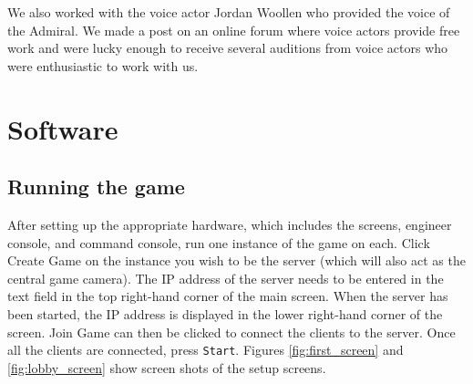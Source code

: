 \documentclass[a4paper,11pt]{article}
\begin{document}
We also worked with the voice actor Jordan Woollen who provided the voice of the Admiral. We made a post on an online forum where voice actors provide free work and were lucky enough to receive several auditions from voice actors who were enthusiastic to work with us.

\section{Software}

\subsection{Running the game}
After setting up the appropriate hardware, which includes the screens, engineer console, and command console, run one instance of the game on each. Click Create Game on the instance you wish to be the server (which will also act as the central game camera). The IP address of the server needs to be entered in the text field in the top right-hand corner of the main screen. When the server has been started, the IP address is displayed in the lower right-hand corner of the screen. Join Game can then be clicked to connect the clients to the server. Once all the clients are connected, press \texttt{Start}. Figures \ref{fig:first_screen} and \ref{fig:lobby_screen} show screen shots of the setup screens.
\end{document}
